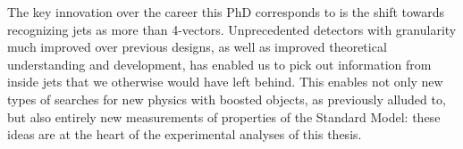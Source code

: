 The key innovation over the career this PhD corresponds to is the shift towards recognizing jets as more than 4-vectors. Unprecedented detectors with granularity much improved over previous designs, as well as improved theoretical understanding and development, has enabled us to pick out information from inside jets that we otherwise would have left behind. This enables not only new types of searches for new physics with boosted objects, as previously alluded to, but also entirely new measurements of properties of the Standard Model: these ideas are at the heart of the experimental analyses of this thesis.


